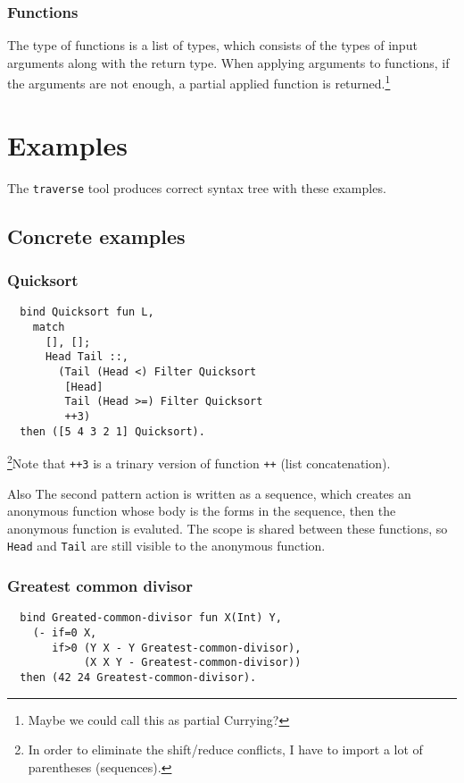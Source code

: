 \documentclass{book}
\begin{document}
\subsection{Functions}
The type of functions is a list of types, which consists of the types of input arguments along with the return type. When applying arguments to functions, if the arguments are not enough, a partial applied function is returned.\footnote{Maybe we could call this as partial Currying?}

\chapter{Examples}
\label{chap:examples}

The \texttt{traverse} tool produces correct syntax tree with these examples.

\section{Concrete examples}
\subsection{Quicksort}
\begin{verbatim}
  bind Quicksort fun L,
    match
      [], [];
      Head Tail ::,
        (Tail (Head <) Filter Quicksort
         [Head]
         Tail (Head >=) Filter Quicksort
         ++3)
  then ([5 4 3 2 1] Quicksort).
\end{verbatim}

\footnote{In order to eliminate the shift/reduce conflicts, I have to import a lot of parentheses (sequences).}Note that \texttt{++3} is a trinary version of function \texttt{++} (list concatenation).

Also The second pattern action is written as a sequence, which creates an anonymous function whose body is the forms in the sequence, then the anonymous function is evaluted. The scope is shared between these functions, so \texttt{Head} and \texttt{Tail} are still visible to the anonymous function.

\subsection{Greatest common divisor}
\begin{verbatim}
  bind Greated-common-divisor fun X(Int) Y,
    (- if=0 X,
       if>0 (Y X - Y Greatest-common-divisor),
            (X X Y - Greatest-common-divisor))
  then (42 24 Greatest-common-divisor).
\end{verbatim}
\end{document}
